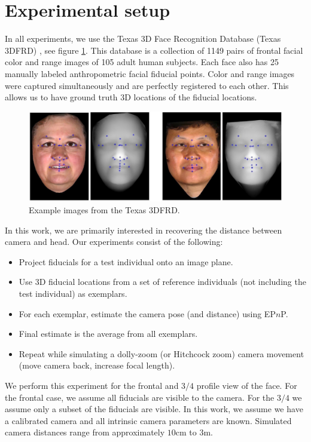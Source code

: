 \documentclass[runningheads]{llncs}
\newcommand {\EPnP} {EP$n$P}
\begin{document}
\section{Experimental setup}
In all experiments, we use the Texas 3D Face Recognition Database (Texas 3DFRD) \cite{gupta2010texas}, see figure \ref{fig:t3dfrd}.  
This database is a collection of 1149 pairs of frontal facial color and range images of 105 adult human subjects.  
Each face also has 25 manually labeled anthropometric facial fiducial points.  
Color and range images were captured simultaneously and are perfectly registered to each other.  
This allows us to have ground truth 3D locations of the fiducial locations.  
\begin{figure}[h]
\centering
\includegraphics[width=.7\linewidth]{resources/figures/t3dfr.jpg}
\caption{Example images from the Texas 3DFRD.}
\label{fig:t3dfrd}
\end{figure}
In this work, we are primarily interested in recovering the distance between camera and head.  Our experiments consist of the following:

\begin{itemize}
\item Project fiducials for a test individual onto an image plane.
\item Use 3D fiducial locations from a set of reference individuals (not including the test individual) as exemplars.
\item For each exemplar, estimate the camera pose (and distance) using \EPnP.
\item Final estimate is the average from all exemplars.
\item Repeat while simulating a dolly-zoom (or Hitchcock zoom) camera movement (move camera back, increase focal length).  
\end{itemize}

We perform this experiment for the frontal and $3/4$ profile view of the face.  
For the frontal case, we assume all fiducials are visible to the camera.  
For the $3/4$ we assume only a subset of the fiducials are visible. 
In this work, we assume we have a calibrated camera and all intrinsic camera parameters are known.  
Simulated camera distances range from approximately $10$cm to $3$m.
\end{document}
